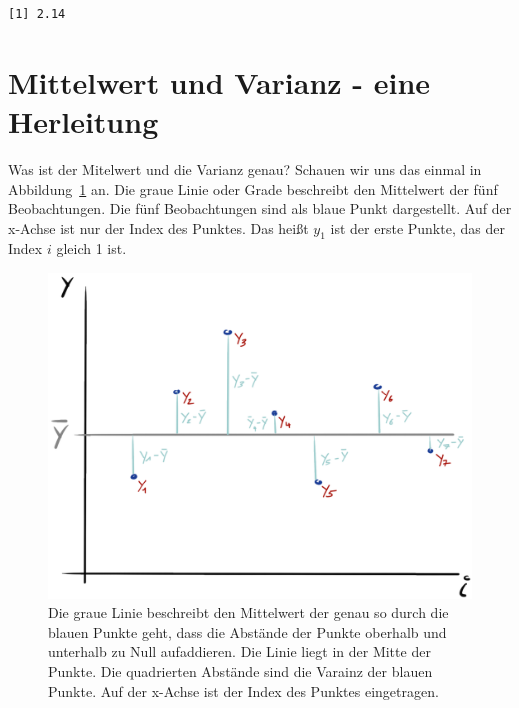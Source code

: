 \documentclass[
  letterpaper,
  DIV=11,
  oneside]{scrreport}
\begin{document}
\begin{verbatim}
[1] 2.14
\end{verbatim}

\hypertarget{mittelwert-und-varianz---eine-herleitung}{%
\section{Mittelwert und Varianz - eine
Herleitung}\label{mittelwert-und-varianz---eine-herleitung}}

Was ist der Mitelwert und die Varianz genau? Schauen wir uns das einmal
in Abbildung~\ref{fig-mean-drawn} an. Die graue Linie oder Grade
beschreibt den Mittelwert der fünf Beobachtungen. Die fünf Beobachtungen
sind als blaue Punkt dargestellt. Auf der x-Achse ist nur der Index des
Punktes. Das heißt \(y_1\) ist der erste Punkte, das der Index \(i\)
gleich 1 ist.

\begin{figure}

{\centering \includegraphics[width=1\textwidth,height=\textheight]{./images/mean-drawn.png}

}

\caption{\label{fig-mean-drawn}Die graue Linie beschreibt den Mittelwert
der genau so durch die blauen Punkte geht, dass die Abstände der Punkte
oberhalb und unterhalb zu Null aufaddieren. Die Linie liegt in der Mitte
der Punkte. Die quadrierten Abstände sind die Varainz der blauen Punkte.
Auf der x-Achse ist der Index des Punktes eingetragen.}

\end{figure}
\end{document}

